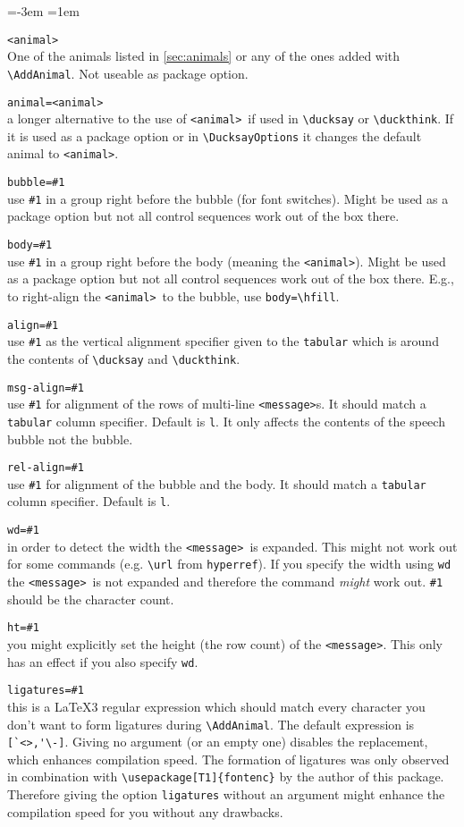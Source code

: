 \documentclass[a4paper,10pt]{article}
\newcommand*{\anml}{\texttt{<animal>}}
\newcommand*{\msg}{\texttt{<message>}}
\newenvironment{codedescription}{%
  \parindent=-3em%
  \parskip=1em%
  \par%
}{}
\begin{document}
\begin{codedescription}
\anml\\
  One of the animals listed in \autoref{sec:animals} or any of the ones added
  with \verb|\AddAnimal|. Not useable as package option.

\texttt{animal=\anml}\\
  a longer alternative to the use of \anml\ if used in \verb|\ducksay| or
  \verb|\duckthink|. If it is used as a package option or in
  \verb|\DucksayOptions| it changes the default animal to \anml.

\texttt{bubble=\#1}\\
  use \texttt{\#1} in a group right before the bubble (for font switches). Might
  be used as a package option but not all control sequences work out of the box
  there.

\texttt{body=\#1}\\
  use \texttt{\#1} in a group right before the body (meaning the \anml). Might
  be used as a package option but not all control sequences work out of the box
  there. E.g., to right-align the \anml\ to the bubble, use \verb|body=\hfill|.

\texttt{align=\#1}\\
  use \texttt{\#1} as the vertical alignment specifier given to the
  \texttt{tabular} which is around the contents of \verb|\ducksay| and
  \verb|\duckthink|.

\texttt{msg-align=\#1}\\
  use \texttt{\#1} for alignment of the rows of multi-line \msg s. It should
  match a \texttt{tabular} column specifier. Default is \texttt{l}. It only
  affects the contents of the speech bubble not the bubble.

\texttt{rel-align=\#1}\\
  use \texttt{\#1} for alignment of the bubble and the body. It should match a
  \texttt{tabular} column specifier. Default is \texttt{l}.

\texttt{wd=\#1}\\
  in order to detect the width the \msg\ is expanded. This might not work out
  for some commands (e.g. \verb|\url| from \texttt{hyperref}). If you specify
  the width using \texttt{wd} the \msg\ is not expanded and therefore the
  command \emph{might} work out. \texttt{\#1} should be the character count.

\texttt{ht=\#1}\\
  you might explicitly set the height (the row count) of the \msg. This only has
  an effect if you also specify \texttt{wd}.

\texttt{ligatures=\#1}\\
  this is a \LaTeX3 regular expression which should match every character you
  don't want to form ligatures during \verb|\AddAnimal|. The default expression
  is \verb|[`<>,'\-]|. Giving no argument (or an empty one) disables the
  replacement, which enhances compilation speed. The formation of ligatures was
  only observed in combination with \verb|\usepackage[T1]{fontenc}| by the
  author of this package. Therefore giving the option \texttt{ligatures} without
  an argument might enhance the compilation speed for you without any
  drawbacks.
\end{codedescription}
\end{document}
